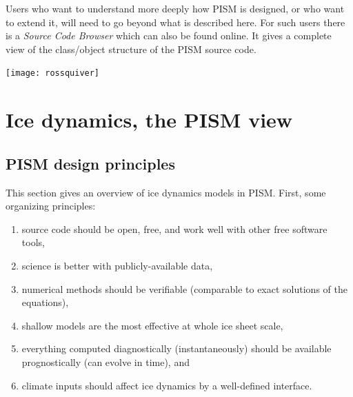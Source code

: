 \documentclass[titlepage,letterpaper,final]{scrartcl}
\begin{document}
Users who want to understand more deeply how PISM is designed, or who want to extend it,  will need to go beyond what is described here.  For such users there is a \emph{Source Code Browser} which can also be found online.  It gives a complete view of the class/object structure of the PISM source code.


\vspace{.3in}
  
\begin{center}
\texttt{[image: rossquiver]}
\end{center}

\vspace{.2in}

\begin{center}
\end{center}


\clearpage\newpage



\clearpage
\newpage
\section{Ice dynamics, the PISM view}\label{sec:dynamics}

\subsection{PISM design principles}  This section gives an overview of ice dynamics models in PISM.  First, some organizing principles:
\begin{enumerate}
\item source code should be open, free, and work well with other free software tools,
\item science is better with publicly-available data,
\item numerical methods should be verifiable (comparable to exact solutions of the equations),
\item shallow models are the most effective at whole ice sheet scale,
\item everything computed diagnostically (instantaneously) should be available prognostically (can evolve in time), and
\item climate inputs should affect ice dynamics by a well-defined interface.
\end{enumerate}
\end{document}
